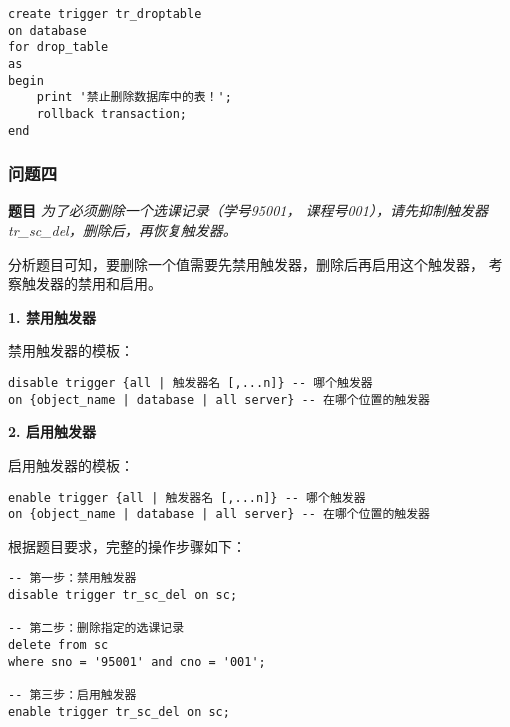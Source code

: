 \begin{mdframed}[backgroundcolor=blue!5]
\begin{verbatim}
create trigger tr_droptable
on database
for drop_table
as
begin
    print '禁止删除数据库中的表！';
    rollback transaction;
end
\end{verbatim}
\end{mdframed}

\subsubsection{问题四}

\textbf{题目} \emph{为了必须删除一个选课记录（学号95001， 课程号001），请先抑制触发器tr\_sc\_del，删除后，再恢复触发器。}

\vspace{6pt}

\qquad 分析题目可知，要删除一个值需要先禁用触发器，删除后再启用这个触发器，
考察触发器的禁用和启用。

\vspace{6pt}

\textbf{1. 禁用触发器}

\qquad 禁用触发器的模板：

\begin{mdframed}[backgroundcolor=gray!10]
\begin{verbatim}
disable trigger {all | 触发器名 [,...n]} -- 哪个触发器
on {object_name | database | all server} -- 在哪个位置的触发器
\end{verbatim}
\end{mdframed}

\textbf{2. 启用触发器}

\qquad 启用触发器的模板：

\begin{mdframed}[backgroundcolor=gray!10]
\begin{verbatim}
enable trigger {all | 触发器名 [,...n]} -- 哪个触发器
on {object_name | database | all server} -- 在哪个位置的触发器
\end{verbatim}
\end{mdframed}

\qquad 根据题目要求，完整的操作步骤如下：

\begin{mdframed}[backgroundcolor=blue!5]
\begin{verbatim}
-- 第一步：禁用触发器
disable trigger tr_sc_del on sc;

-- 第二步：删除指定的选课记录
delete from sc
where sno = '95001' and cno = '001';

-- 第三步：启用触发器
enable trigger tr_sc_del on sc;
\end{verbatim}
\end{mdframed}

